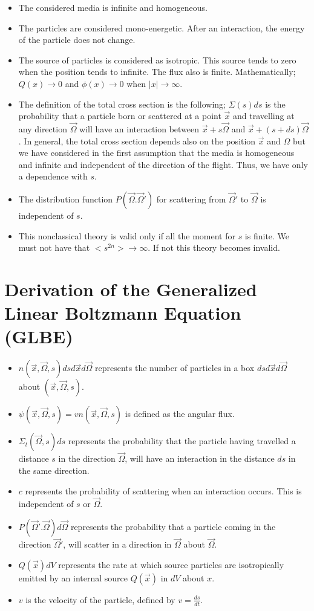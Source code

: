 \documentclass[a4paper, 12pt]{report}
\newcommand{\bl}{\big<}
\newcommand{\bg}{\big>}
\begin{document}
\begin{itemize}
\item The considered media is infinite and homogeneous.
\item The particles are considered mono-energetic. After an interaction, the energy of the particle does not change.
\item The source of particles is considered as isotropic. This source tends to zero when the position tends to infinite. The flux also is finite. Mathematically;
$Q(x) \rightarrow 0$ and $\phi(x) \rightarrow 0$ when $|x|\rightarrow \infty$.
\item The definition of the total cross section is the following; $\Sigma(s)ds$ is the probability that a particle born or scattered at a point $\vec{x}$ and travelling at any direction $\vec{\Omega}$ will have an interaction between $\vec{x}+s\vec{\Omega}$ and $\vec{x}+(s+ds)\vec{\Omega}$. In general, the total cross section depends also on the position $\vec{x}$ and $\Omega$ but we have considered in the first assumption that the media is homogeneous and infinite and independent of the direction of the flight. Thus, we have only a dependence with $s$.
\item The distribution function $P(\vec{\Omega}.\vec{\Omega}')$ for scattering from $\vec{\Omega}'$ to $\vec{\Omega}$ is independent of $s$.
\item This nonclassical theory is valid only if all the moment for $s$ is finite. We must not have that $\bl s^{2n} \bg \rightarrow \infty $. If not this theory becomes invalid.
\end{itemize}

\section{Derivation of the Generalized Linear Boltzmann Equation (GLBE)}
\begin{itemize}
\item $n(\vec{x},\vec{\Omega},s) dsd\vec{x}d\vec{\Omega}$ represents the number of particles in a box $dsd\vec{x}d\vec{\Omega}$ about $(\vec{x},\vec{\Omega},s)$.
\item $\psi(\vec{x},\vec{\Omega},s) = v n(\vec{x},\vec{\Omega},s)$ is defined as the angular flux.
\item $\Sigma_t(\vec{\Omega},s)ds$ represents the probability that the particle having travelled a distance $s$ in the direction $\vec{\Omega}$, will have an interaction in the distance $ds$ in the same direction.
\item $c$ represents the probability of scattering when an interaction occurs. This is independent of $s$ or $\vec{\Omega}$.
\item $P(\vec{\Omega}'.\vec{\Omega})d\vec{\Omega}$ represents the probability that a particle coming in the direction $\vec{\Omega}'$, will scatter in a direction in $\vec{\Omega}$ about $\vec{\Omega}$.
\item $Q(\vec{x})dV$ represents the rate at which source particles are isotropically
emitted by an internal source $Q(\vec{x})$ in $dV$ about $x$.
\item $v$ is the velocity of the particle, defined by $v = \frac{ds}{dt}$.
\end{itemize}
 
\end{document}
